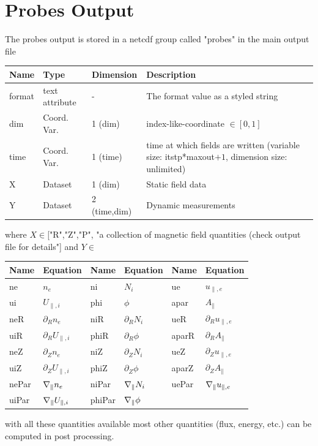 \section{Probes Output}\label{sec:probes-output}
The probes output is stored in a netcdf group called "probes" in the main output file
%
\begin{longtable}{lll>{\RaggedRight}p{7cm}}
\toprule
\rowcolor{gray!50}\textbf{Name} &  \textbf{Type} & \textbf{Dimension} & \textbf{Description}  \\ \midrule
format           & text attribute   & - & The format value as a styled string \\
dim              & Coord. Var. & 1 (dim) & index-like-coordinate $\in [0,1]$ \\
time             & Coord. Var. & 1 (time)& time at which fields are written (variable size: itstp*maxout$+1$, dimension size: unlimited) \\
X                & Dataset & 1 (dim)      & Static field data \\
Y                & Dataset & 2 (time,dim) & Dynamic measurements \\
\bottomrule
\end{longtable}
where $X\in $["R","Z","P", "a collection of magnetic field quantities (check output file for details"]
and $Y\in $
\begin{longtable}{llllll}
\toprule
\rowcolor{gray!50}\textbf{Name} &  \textbf{Equation} & \textbf{Name} &  \textbf{Equation} & \textbf{Name} & \textbf{Equation}\\
\midrule
    ne &$n_e$ &
    ni &$N_i$ &
    ue &$u_{\parallel,e}$ \\
    ui &$U_{\parallel,i}$ &
    phi &$\phi$ &
    apar &$A_\parallel$ \\
    neR &$\partial_R n_e$ &
    niR &$\partial_R N_i$ &
    ueR &$\partial_R u_{\parallel,e}$ \\
    uiR &$\partial_R U_{\parallel,i}$ &
    phiR &$\partial_R \phi$ &
    aparR &$\partial_R A_\parallel$ \\
    neZ &$\partial_Z n_e$ &
    niZ &$\partial_Z N_i$ &
    ueZ &$\partial_Z u_{\parallel,e}$ \\
    uiZ &$\partial_Z U_{\parallel,i}$ &
    phiZ &$\partial_Z \phi$ &
    aparZ &$\partial_Z A_\parallel$ \\
    nePar &$\nabla_\parallel n_e$ &
    niPar &$\nabla_\parallel N_i$ &
    uePar &$\nabla_\parallel u_{\parallel,e}$ \\
    uiPar &$\nabla_\parallel U_{\parallel,i}$ &
    phiPar &$\nabla_\parallel \phi$ &
     & \\
\bottomrule
\end{longtable}
with all these quantities available most other quantities (flux, energy, etc.)
can be computed in post processing.


